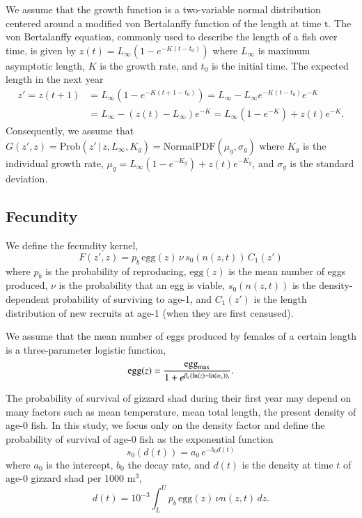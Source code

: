 \documentclass[preprint,review,12pt,authoryear]{elsarticle}
\def\ds{\displaystyle}
\begin{document}
We assume that the growth function is a two-variable normal distribution centered around a modified von Bertalanffy function of the length at time t. The von Bertalanffy equation, commonly used to describe the length of a fish over time, is given by $\ds z(t) = L_{\infty} \left(1-e^{-K(t-t_0)} \right)$ where $L_\infty$ is maximum asymptotic length, $K$ is the growth rate, and $t_0$ is the initial time. The expected length in the next year
\begin{align*}
 z' =z(t+1) & =  L_{\infty} \left(1-e^{-K(t+1-t_0)} \right) =  L_{\infty} - L_{\infty}e^{-K(t-t_0)} e^{-K} \\
 & =   L_\infty - \left( z(t)-L_\infty \right) e^{-K} =   L_{\infty} \left(1-e^{-K} \right) + z(t)e^{-K}. 
 \end{align*}
Consequently, we assume that 
$\ds G(z',z) = \mathrm{Prob}(z' \, | \,  z, L_{\infty}, K_g) = \mathrm{Normal PDF}(\mu_g, \sigma_g)$
where $K_g$ is the individual growth rate, $\mu_g =  L_{\infty} \left(1-e^{-K_g} \right) + z(t)e^{-K_g}$, and $\sigma_g$ is the standard deviation.

\subsection{Fecundity}
We define the fecundity kernel, 
\begin{equation}\label{eq:fecundity}
F(z', z) = p_b \, \mbox{egg}(z) \, \nu \, s_0(n(z,t)) \, C_1(z')
\end{equation}
where $p_b$ is the probability of reproducing, $\mbox{egg}(z)$ is the mean number of eggs produced, $\nu$ is the probability that an egg is viable, $s_0(n(z,t))$ is the density-dependent probability of surviving to age-1, and $C_1 (z')$ is the length distribution of new recruits at age-1 (when they are first censused).

We assume that the mean number of eggs produced by females of a certain length is a three-parameter logistic function,
\begin{equation}\label{eq:egg}
\mbox{egg}(z) = \frac{\mbox{egg}_{\rm max}}{1+e^{\beta_e(\ln(z)-\ln(\alpha_e)),}}.
\end{equation}

The probability of survival of gizzard shad during their first year may depend on many factors \citep{michaletz2010overwinter} such as mean temperature, mean total length, the present density of age-0 fish.  In this study, we focus only on the density factor and define the probability of survival of age-0 fish as the exponential function
\begin{equation}\label{eq:s0}
s_0(d(t)) = a_0 \, e^{-b_0 d(t)}
\end{equation}
where $a_0$ is the intercept, $b_0$ the decay rate, and $d(t)$ is the density at time $t$ of age-0 gizzard shad per 1000 m$^3$, 
\[ d(t) = 10^{-3} \int_L^U p_b \, \mbox{egg}(z) \, \nu n(z,t) \, dz. \]  
\end{document}
